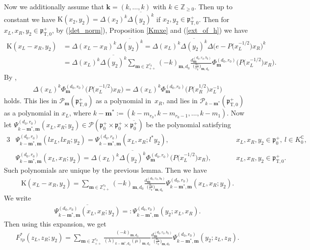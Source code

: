 \documentclass[pdftex]{sigma}
\numberwithin{equation}{section}
\newcommand{\bk}{\mathbf{k}}
\newcommand{\bm}{\mathbf{m}}
\newcommand{\BZ}{\mathbb{Z}}
\newcommand{\BC}{\mathbb{C}}
\newcommand{\fp}{\mathfrak{p}}
\newcommand{\cP}{\mathcal{P}}
\newcommand{\rK}{\mathrm{K}}
\newcommand{\rT}{\mathrm{T}}
\begin{document}
Now we additionally assume that $\bk=(k,\ldots,k)$ with $k\in\BZ_{\ge 0}$.
Then up to constant we have $\rK(x_2,y_2)=\Delta(x_2)^k\overline{\Delta(y_2)^k}$ if $x_2,y_2\in\fp^+_{\rT,0}$.
Then for $x_L,x_R,y_2\in\fp^+_{\rT,0}$, by (\ref{det_norm}), Proposition \ref{Kmxe} and (\ref{ext_of_h}) we have
\begin{align*}
\rK(x_L-x_R,y_2)&=\Delta(x_L-x_R)^k\overline{\Delta(y_2)^k}
=\Delta(x_L)^k\overline{\Delta(y_2)^k}\Delta\big(e-P\big(x^{-1/2}_L\big)x_R\big)^k\\
&=\Delta(x_L)^k\overline{\Delta(y_2)^k}
\sum_{\bm\in\BZ_{++}^{r_0}}(-k)_{\bm,d_0}\frac{d_\bm^{(d_0,r_0,b_0)}}{\big(\frac{n_0}{r_0}\big)_{\bm,d_0}}
\Phi_\bm^{(d_0,r_0)}\big(P\big(x^{-1/2}_L\big)x_R\big).
\end{align*}
By \cite[Lemma XIV.1.2]{FK},
\begin{gather*} \Delta(x_L)^k\Phi_\bm^{(d_0,r_0)}\big(P\big(x^{-1/2}_L\big)x_R\big)=\Delta(x_L)^k\Phi_\bm^{(d_0,r_0)}\big(P\big(x^{1/2}_R\big)x_L^{-1}\big)\end{gather*} holds.
This lies in $\cP_\bm(\fp^+_{\rT,0})$ as a polynomial in~$x_R$, and lies in $\cP_{k-\bm^*}(\fp^+_{\rT,0})$ as a polynomial in $x_L$,
where $k-\bm^*:=(k-m_{r_0},k-m_{r_0-1},\ldots,k-m_1)$.
Now let $\Psi_{k-\bm^*,\bm}^{(d_0,r_0)}(x_L,x_R;y_2)\in \cP(\fp^+_0\times\fp^+_0\times\overline{\fp^+_0})$ be the polynomial satisfying
\begin{alignat*}{3}
&\Psi_{k-\bm^*,\bm}^{(d_0,r_0)}(lx_L,lx_R;y_2)=\Psi_{k-\bm^*,\bm}^{(d_0,r_0)}(x_L,x_R;l^*y_2),\quad && x_L,x_R,y_2\in\fp^+_0,\ l\in K^\BC_0,& \\
& \Psi_{k-\bm^*,\bm}^{(d_0,r_0)}(x_L,x_R;y_2)=\Delta(x_L)^k\overline{\Delta(y_2)^k}\Phi_\bm^{(d_0,r_0)}\big(P\big(x^{-1/2}_L\big)x_R\big),\qquad && x_L,x_R,y_2\in\fp^+_{\rT,0}.&
\end{alignat*}
Such polynomials are unique by the previous lemma. Then we have
\begin{align*}
\rK(x_L-x_R,y_2)=\sum_{\bm\in\BZ_{++}^{r_0}}(-k)_{\bm,d_0}\frac{d_\bm^{(d_0,r_0,b_0)}}{\big(\frac{n_0}{r_0}\big)_{\bm,d_0}}
\Psi_{k-\bm^*,\bm}^{(d_0,r_0)}(x_L,x_R;y_2).
\end{align*}
We write
\begin{gather*} \overline{\Psi_{k-\bm^*,\bm}^{(d_0,r_0)}(x_L,x_R;y_2)}=:\Psi_{k-\bm^*,\bm}^{(d_0,r_0)}(y_2;x_L,x_R). \end{gather*}
Then using this expansion, we get
\begin{gather*} F_{\tau\rho}^*(z_L,z_R;y_2)
=\sum_{\bm\in\BZ_{++}^{r_0}}\frac{(-k)_{\bm,d_0}}{(\lambda)_{k-\bm^*,d_0}(\mu)_{\bm,d_0}}
\frac{d_\bm^{(d_0,r_0,b_0)}}{\big(\frac{n_0}{r_0}\big)_{\bm,d_0}}
\Psi_{k-\bm^*,\bm}^{(d_0,r_0)}(y_2;z_L,z_R). \end{gather*}
\end{document}

